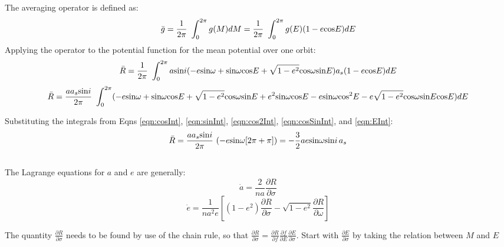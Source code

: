 \documentclass[]{aiaa-tc}%
\begin{document}
The averaging operator is defined as:
	\begin{equation}
		\bar{g} = \frac{1}{2\pi}\ \int_{0}^{2\pi}g(M)dM= \frac{1}{2\pi}\ \int_{0}^{2\pi}g(E)(1-e\textup{cos}E)dE
		\label{eqn:avg_operator}
	\end{equation}
Applying the operator to the potential function for the mean potential over one orbit:
	\begin{equation}
		\bar{R} = \frac{1}{2\pi}\ \int_{0}^{2\pi} a\textup{sin}i(-e\textup{sin}\omega+\textup{sin}\omega \textup{cos}E +\sqrt{1-e^2}\textup{cos}\omega\textup{sin}E )a_s(1-e\textup{cos}E)dE
	\end{equation}
	\begin{equation}
		\bar{R} = \frac{aa_s\textup{sin}i}{2\pi}\ \int_{0}^{2\pi} (-e\textup{sin}\omega+\textup{sin}\omega \textup{cos}E +\sqrt{1-e^2}\textup{cos}\omega\textup{sin}E +e^2\textup{sin}\omega\textup{cos}E-e\textup{sin}\omega \textup{cos}^2E-e\sqrt{1-e^2}\textup{cos}\omega\textup{sin}E\textup{cos}E)dE
	\end{equation}

Substituting the integrals from Eqns \ref{eqn:cosInt}, \ref{eqn:sinInt}, \ref{eqn:cos2Int}, \ref{eqn:cosSinInt}, and \ref{eqn:EInt}:
	\begin{equation}
		\bar{R} = \frac{aa_s\textup{sin}i}{2\pi}\  (-e\textup{sin}\omega[2\pi+\pi])=-\frac{3}{2}ae\textup{sin} \omega \textup{sin}i\,   a_s 
	\end{equation}


\subsection {}

The Lagrange equations for $a$ and $e$ are generally:
	\begin{equation}
		\dot{a}=\frac{2}{na}\frac{\partial R}{\partial \sigma} 
		\label{eqn:a_dot_gen}
	\end{equation}
	\begin{equation}
		\dot{e}=\frac{1}{na^2e}\left [ (1-e^2)\frac{\partial R}{\partial \sigma}  - \sqrt{1-e^2}\frac{\partial R}{\partial \omega} \right]
		\label{eqn:e_dot_gen}
	\end{equation}

The quantity $\frac{\partial R}{\partial \sigma}$ needs to be found by use of the chain rule, so that $\frac{\partial R}{\partial \sigma} = \frac{\partial R}{\partial f}\frac{\partial f}{\partial E}\frac{\partial E}{\partial \sigma}$. Start with $\frac{\partial E}{\partial \sigma}$ by taking the relation between $M$ and $E$ 
\end{document}
